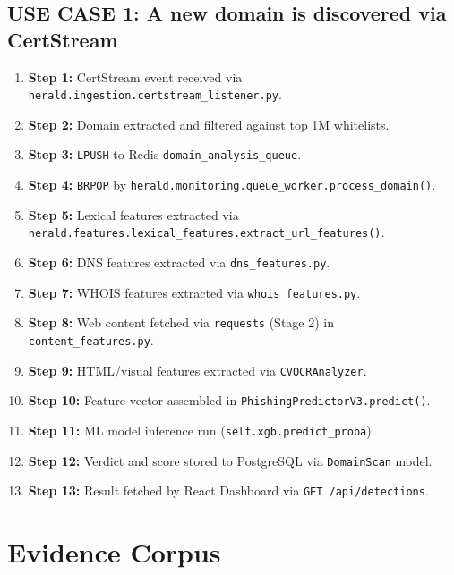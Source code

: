 \documentclass[12pt,a4paper]{report}
\begin{document}
\section{USE CASE 1: A new domain is discovered via CertStream}
\begin{enumerate}
\item \textbf{Step 1:} CertStream event received via \texttt{herald.ingestion.certstream\_listener.py}.
\item \textbf{Step 2:} Domain extracted and filtered against top 1M whitelists.
\item \textbf{Step 3:} \texttt{LPUSH} to Redis \texttt{domain\_analysis\_queue}.
\item \textbf{Step 4:} \texttt{BRPOP} by \texttt{herald.monitoring.queue\_worker.process\_domain()}.
\item \textbf{Step 5:} Lexical features extracted via \texttt{herald.features.lexical\_features.extract\_url\_features()}.
\item \textbf{Step 6:} DNS features extracted via \texttt{dns\_features.py}.
\item \textbf{Step 7:} WHOIS features extracted via \texttt{whois\_features.py}.
\item \textbf{Step 8:} Web content fetched via \texttt{requests} (Stage 2) in \texttt{content\_features.py}.
\item \textbf{Step 9:} HTML/visual features extracted via \texttt{CVOCRAnalyzer}.
\item \textbf{Step 10:} Feature vector assembled in \texttt{PhishingPredictorV3.predict()}.
\item \textbf{Step 11:} ML model inference run (\texttt{self.xgb.predict\_proba}).
\item \textbf{Step 12:} Verdict and score stored to PostgreSQL via \texttt{DomainScan} model.
\item \textbf{Step 13:} Result fetched by React Dashboard via \texttt{GET /api/detections}.
\end{enumerate}

\chapter{Evidence Corpus}
\end{document}
